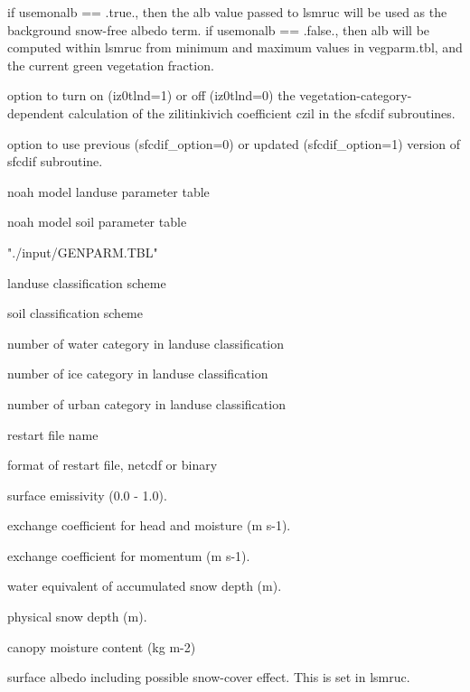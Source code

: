   if usemonalb == .true., then
 the alb value passed to lsmruc will be used as the background
 snow-free albedo term.  if usemonalb == .false., then alb will be
 computed within lsmruc from minimum and maximum values in vegparm.tbl,
 and the current green vegetation fraction.

  option to turn on (iz0tlnd=1) or
 off (iz0tlnd=0) the vegetation-category-dependent calculation of
 the zilitinkivich coefficient czil in the sfcdif subroutines.

  option to use previous (sfcdif\_option=0)
 or updated (sfcdif\_option=1) version of sfcdif subroutine.

  noah model landuse parameter table

  noah model soil parameter table

  "./input/GENPARM.TBL"  

  landuse classification scheme

  soil classification scheme

  number of water category in landuse
 classification

  number of ice category in landuse
 classification

  number of urban category in landuse
 classification

  restart file name

  format of restart file, netcdf or
 binary 

  surface emissivity (0.0 - 1.0).

  exchange coefficient for head and moisture (m s-1).

  exchange coefficient for momentum (m s-1).

  water equivalent of accumulated snow depth (m).

  physical snow depth (m).

  canopy moisture content (kg m-2)

  surface albedo including possible snow-cover
 effect.  This is set in lsmruc.

